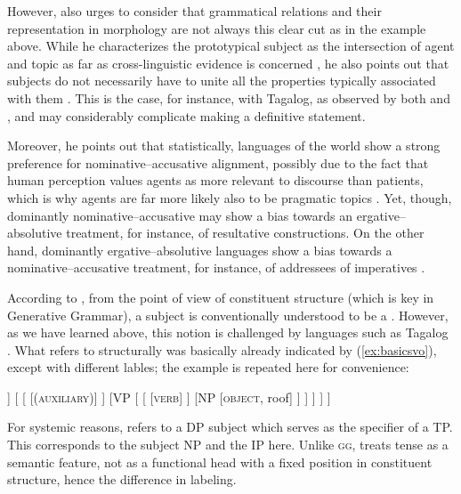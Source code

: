 However, \citet{comrie1989} also urges to consider that grammatical relations
and their representation in morphology are not always this clear cut as in the
example above. While he characterizes the prototypical subject as the
intersection of agent and topic as far as cross-linguistic evidence is
concerned \citep[107]{comrie1989}, he also points out that subjects do not
necessarily have to unite all the properties typically associated with them
\citep[110]{comrie1989}. This is the case, for instance, with Tagalog, as
observed by both \citet{schachter1976} and \citet{kroeger1991}, and may
considerably complicate making a definitive statement.

Moreover, he points out that statistically, languages of the world show a
strong preference for nominative--accusative alignment, possibly due to the
fact that human perception values agents as more relevant to discourse than
patients, which is why agents are far more likely also to be pragmatic topics
\citep[120]{comrie1989}. Yet, though, dominantly nominative--accusative may
show a bias towards an ergative--absolutive treatment, for instance, of
resultative constructions. On the other hand, dominantly ergative--absolutive
languages show a bias towards a nominative--accu\-sa\-tive treatment, for
instance, of addressees of imperatives \citep[116--119]{comrie1989}.

According to \citep{carnie2013}, from the point of view of constituent
structure (which is key in Generative Grammar), a subject is conventionally
understood to be a . However, as
we have learned above, this notion is challenged by languages such as Tagalog
\citep[225]{kroeger1991}. What \citet{carnie2013} refers to structurally was
basically already indicated by (\ref{ex:basicsvo}), except with different
lables; the example is repeated here for convenience:

\ex\label{ex:basicsvo2}
\begin{forest}
[IP
	[NP
		[\textsc{subject}, roof]
	]
	[
		[
			[\textsc{(auxiliary)}]
		]
		[VP
			[
				[
					[\textsc{verb}]
				]
				[NP
					[\textsc{object}, roof]
				]
			]
		]
	]
]
\end{forest}
\xe

For systemic reasons, \citet{carnie2013} refers to a DP subject which serves as
the specifier of a TP. This corresponds to the subject NP and the IP here.
Unlike \textsc{gg}, \Lfg{} treats tense as a semantic feature, not as a
functional head with a fixed position in constituent structure, hence the
difference in labeling.

